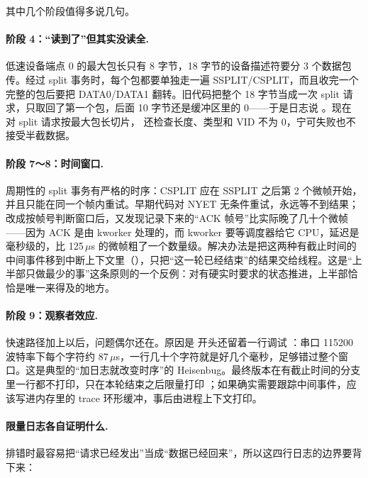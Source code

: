 其中几个阶段值得多说几句。

\paragraph{阶段 4：“读到了”但其实没读全.} 低速设备端点 0 的最大包长只有 8 字节，18 字节的设备描述符要分 3 个数据包传。经过 split 事务时，每个包都要单独走一遍 SSPLIT/CSPLIT，而且收完一个完整的包后要把 DATA0/DATA1 翻转。旧代码把整个 18 字节当成一次 split 请求，只取回了第一个包，后面 10 字节还是缓冲区里的 0——于是日志说 。现在  对 split 请求按最大包长切片， 还检查长度、类型和 VID 不为 0，宁可失败也不接受半截数据。

\paragraph{阶段 7～8：时间窗口.} 周期性的 split 事务有严格的时序：CSPLIT 应在 SSPLIT 之后第 2 个微帧开始，并且只能在同一个帧内重试。早期代码对 NYET 无条件重试，永远等不到结果；改成按帧号判断窗口后，又发现记录下来的“ACK 帧号”比实际晚了几十个微帧——因为 ACK 是由 kworker 处理的，而 kworker 要等调度器给它 CPU，延迟是毫秒级的，比 125\,$\mu$s 的微帧粗了一个数量级。解决办法是把这两种有截止时间的中间事件移到中断上下文里（），只把“这一轮已经结束”的结果交给线程。这是“上半部只做最少的事”这条原则的一个反例：对有硬实时要求的状态推进，上半部恰恰是唯一来得及的地方。

\paragraph{阶段 9：观察者效应.} 快速路径加上以后，问题偶尔还在。原因是  开头还留着一行调试 ：串口 115200 波特率下每个字符约 87\,$\mu$s，一行几十个字符就是好几个毫秒，足够错过整个窗口。这是典型的“加日志就改变时序”的 Heisenbug。最终版本在有截止时间的分支里一行都不打印，只在本轮结束之后限量打印 ；如果确实需要跟踪中间事件，应该写进内存里的 trace 环形缓冲，事后由进程上下文打印。

\paragraph{限量日志各自证明什么.} 排错时最容易把“请求已经发出”当成“数据已经回来”，所以这四行日志的边界要背下来：

